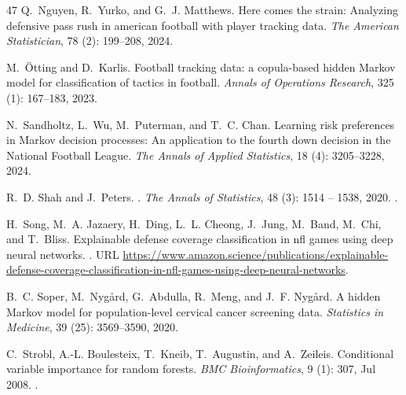 \documentclass[namedate,webpdf,modern,medium]{oup-authoring-template}
\begin{document}
\begin{thebibliography}{47}
Q.~Nguyen, R.~Yurko, and G.~J. Matthews.
\newblock Here comes the strain: Analyzing defensive pass rush in american
  football with player tracking data.
\newblock \emph{The American Statistician}, 78 (2): 199--208,
  2024.

M.~{\"O}tting and D.~Karlis.
\newblock Football tracking data: a copula-based hidden {M}arkov model for
  classification of tactics in football.
\newblock \emph{Annals of Operations Research}, 325 (1):
  167--183, 2023.

N.~Sandholtz, L.~Wu, M.~Puterman, and T.~C. Chan.
\newblock Learning risk preferences in {M}arkov decision processes: An
  application to the fourth down decision in the {N}ational {F}ootball
  {L}eague.
\newblock \emph{The Annals of Applied Statistics}, 18 (4):
  3205--3228, 2024.

R.~D. Shah and J.~Peters.
.
\newblock \emph{The Annals of Statistics}, 48 (3): 1514 --
  1538, 2020.
\newblock {}.

H.~Song, M.~A. Jazaery, H.~Ding, L.~L. Cheong, J.~Jung, M.~Band, M.~Chi, and
  T.~Bliss.
\newblock Explainable defense coverage classification in nfl games using deep
  neural networks.
.
\newblock URL
  \url{https://www.amazon.science/publications/explainable-defense-coverage-classification-in-nfl-games-using-deep-neural-networks}.

B.~C. Soper, M.~Nyg{\aa}rd, G.~Abdulla, R.~Meng, and J.~F. Nyg{\aa}rd.
\newblock A hidden {M}arkov model for population-level cervical cancer
  screening data.
\newblock \emph{{S}tatistics in {M}edicine}, 39 (25):
  3569--3590, 2020.

C.~Strobl, A.-L. Boulesteix, T.~Kneib, T.~Augustin, and A.~Zeileis.
\newblock Conditional variable importance for random forests.
\newblock \emph{BMC Bioinformatics}, 9 (1): 307, Jul 2008.
\newblock {}.


\end{thebibliography}
\end{document}
